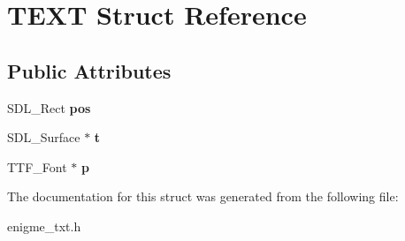 \hypertarget{structTEXT}{}\section{T\+E\+XT Struct Reference}
\label{structTEXT}
\subsection*{Public Attributes}
\begin{DoxyCompactItemize}
\item 
\mbox{\label{structTEXT_a0a096fa963aeb8d0b753419d2fc73dd5}} 
S\+D\+L\+\_\+\+Rect {\bfseries pos}
\item 
\mbox{\label{structTEXT_ac80fa6c775f1d4727f049a029cc97b6d}} 
S\+D\+L\+\_\+\+Surface $\ast$ {\bfseries t}
\item 
\mbox{\label{structTEXT_aed8edaad09b4ead8bc30b09bf332dc97}} 
T\+T\+F\+\_\+\+Font $\ast$ {\bfseries p}
\end{DoxyCompactItemize}


The documentation for this struct was generated from the following file\+:\begin{DoxyCompactItemize}
\item 
enigme\+\_\+txt.\+h\end{DoxyCompactItemize}
